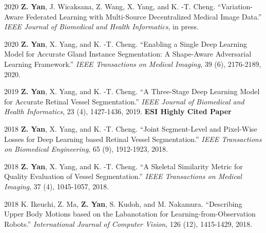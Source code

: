 \documentclass[12pt,letterpaper]{report}
\begin{document}
	\begin{tablist}
		
		\item[2020] \tab \textbf{Z. Yan}, J. Wicaksana, Z. Wang, X. Yang, and K. -T. Cheng. \enquote{Variation-Aware Federated Learning with Multi-Source Decentralized Medical Image Data.} \textit{IEEE Journal of Biomedical and Health Informatics}, in press.
		
		\item[2020] \tab \textbf{Z. Yan}, X. Yang, and K. -T. Cheng. \enquote{Enabling a Single Deep Learning Model for Accurate Gland Instance Segmentation: A Shape-Aware Adversarial Learning Framework.} \textit{IEEE Transactions on Medical Imaging}, 39 (6), 2176-2189, 2020.
		
		\item[2019] \tab \textbf{Z. Yan}, X. Yang, and K. -T. Cheng. \enquote{A Three-Stage Deep Learning Model for Accurate Retinal Vessel Segmentation.}  \textit{IEEE Journal of Biomedical and Health Informatics}, 23 (4), 1427-1436, 2019. \textbf{ESI Highly Cited Paper}
		
		\item[2018] \tab \textbf{Z. Yan}, X. Yang, and K. -T. Cheng. \enquote{Joint Segment-Level and Pixel-Wise Losses for Deep Learning based Retinal Vessel Segmentation.} \textit{IEEE Transactions on Biomedical Engineering}, 65 (9), 1912-1923, 2018.
		
		\item[2018] \tab \textbf{Z. Yan}, X. Yang, and K. -T. Cheng. \enquote{A Skeletal Similarity Metric for Quality Evaluation of Vessel Segmentation.} \textit{IEEE Transactions on Medical Imaging}, 37 (4), 1045-1057, 2018.
		
		\item[2018] \tab K. Ikeuchi, Z. Ma, \textbf{Z. Yan}, S. Kudoh, and M. Nakamura. \enquote{Describing Upper Body Motions based on the Labanotation for Learning-from-Observation Robots.} \textit{International Journal of Computer Vision}, 126 (12), 1415-1429, 2018.
		
%		
%		
		
	\end{tablist}
\end{document}
